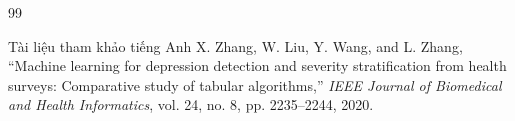 \documentclass{uetgraduation}
\begin{document}
\begin{thebibliography}{99}
\begin{bibsection}{Tài liệu tham khảo tiếng Anh}
    X. Zhang, W. Liu, Y. Wang, and L. Zhang,
    ``Machine learning for depression detection and severity stratification from health surveys: Comparative study of tabular algorithms,''
    \textit{IEEE Journal of Biomedical and Health Informatics}, vol. 24, no. 8, pp. 2235--2244, 2020.
\end{bibsection}

\end{thebibliography}
\end{document}
